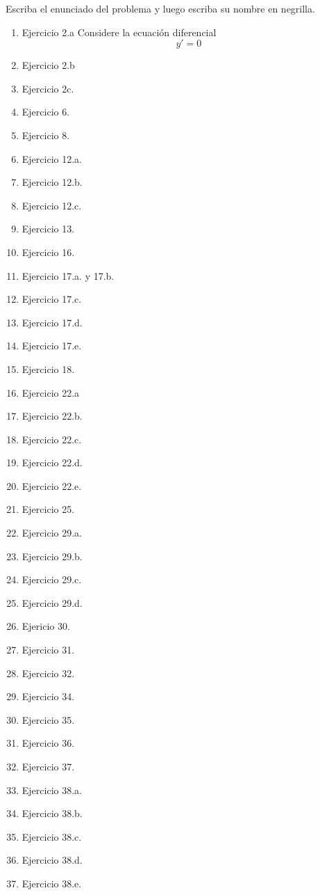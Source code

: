 
Escriba el enunciado del problema y luego escriba su nombre en negrilla. 

\begin{enumerate}
    \item Ejercicio 2.a Considere la ecuación diferencial $$y' = 0$$
    \item Ejercicio 2.b
    \item Ejercicio 2c.
    \item Ejercicio 6.
    \item Ejercicio 8.
    \item Ejercicio 12.a.
    \item Ejercicio 12.b.
    \item Ejercicio 12.c.
    \item Ejercicio 13.
    \item Ejercicio 16.
    \item Ejercicio 17.a. y 17.b.
    \item Ejercicio 17.c.
    \item Ejercicio 17.d.
    \item Ejercicio 17.e.
    \item Ejercicio 18.
    \item Ejercicio 22.a 
    \item Ejercicio 22.b.
    \item Ejercicio 22.c.
    \item Ejercicio 22.d.
    \item Ejercicio 22.e.
    \item Ejercicio 25.
    \item Ejercicio 29.a.
    \item Ejercicio 29.b.
    \item Ejercicio 29.c.
    \item Ejercicio 29.d.
    \item Ejericio 30.
    \item Ejercicio 31.
    \item Ejercicio 32.
    \item Ejercicio 34.
    \item Ejercicio 35.
    \item Ejercicio 36.
    \item Ejercicio 37.
    \item Ejercicio 38.a.
    \item Ejercicio 38.b.
    \item Ejercicio 38.c.
    \item Ejercicio 38.d.
    \item Ejercicio 38.e.

\end{enumerate}
